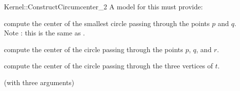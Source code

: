 \begin{ccRefFunctionObjectConcept}{Kernel::ConstructCircumcenter_2}
A model for this must provide:


 {compute the center of the smallest circle passing through the points $p$ and $q$.  Note : this is the same as . }

 {compute the center of the circle passing through the points $p$, $q$, and $r$.
  }

 {compute the center of the circle passing through the three vertices of $t$.
  }

\ccRefines
{} (with three arguments)

\ccSeeAlso
{} \\

\end{ccRefFunctionObjectConcept}
